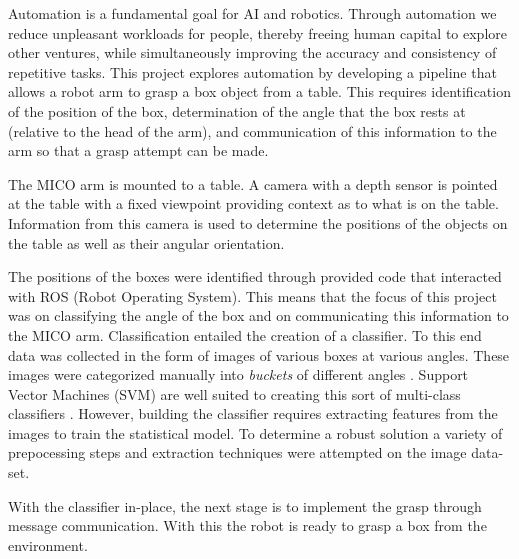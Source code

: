 \documentclass[letterpaper, 10 pt, conference]{conf/ieeeconf}  %
\begin{document}
Automation is a fundamental goal for AI and robotics. Through automation we
reduce unpleasant workloads for people, thereby freeing human capital to explore
other ventures, while simultaneously improving the accuracy and consistency of
repetitive tasks. This project explores automation by developing a pipeline that
allows a robot arm to grasp a box object from a table. This requires
identification of the position of the box, determination of the angle that the
box rests at (relative to the head of the arm), and communication of this
information to the arm so that a grasp attempt can be made.

The MICO arm is mounted to a table. A camera with a depth sensor is pointed at
the table with a fixed viewpoint providing context as to what is on the table.
Information from this camera is used to determine the positions of the objects
on the table as well as their angular orientation.

The positions of the boxes were identified through provided code that interacted
with ROS (Robot Operating System). This means that the focus of this project was
on classifying the angle of the box and on communicating this information to the
MICO arm. Classification entailed the creation of a classifier. To this end data
was collected in the form of images of various boxes at various angles. These
images were categorized manually into \textit{buckets} of different angles .
Support Vector Machines (SVM) are well suited to creating this sort of
multi-class classifiers \cite{Hsu2015}. However, building the classifier
requires extracting features from the images to train the statistical model. To
determine a robust solution a variety of prepocessing steps and extraction
techniques were attempted on the image data-set.

With the classifier in-place, the next stage is to implement the grasp
through message communication. With this the robot is ready to
grasp a box from the environment.
\end{document}

